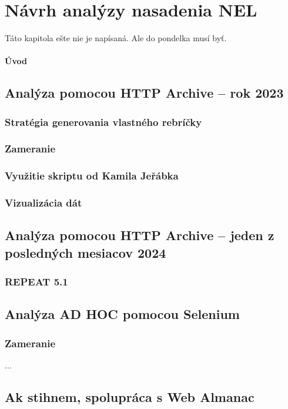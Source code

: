 \chapter{Návrh analýzy nasadenia NEL}
\label{possible-analysis-strategies}

Táto kapitola ešte nie je napísaná.
Ale do pondelka musí byť.

\subsubsection{Úvod}

\section{Analýza pomocou HTTP Archive -- rok 2023}
\subsection{Stratégia generovania vlastného rebríčky}
\subsection{Zameranie}
\subsection{Využitie skriptu od Kamila Jeřábka}
\subsection{Vizualizácia dát}

\section{Analýza pomocou HTTP Archive -- jeden z posledných mesiacov 2024}
\subsection{REPEAT 5.1}

\section{Analýza AD HOC pomocou Selenium}
\subsection{Zameranie}
...

\section{Ak stihnem, spolupráca s Web Almanac}
